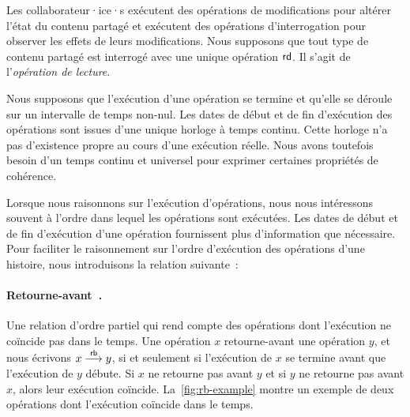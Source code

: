 Les collaborateur·ice·s exécutent des opérations de modifications pour altérer l'état du contenu partagé et exécutent des opérations d'interrogation pour observer les effets de leurs modifications.
Nous supposons que tout type de contenu partagé est interrogé avec une unique opération $\operatorname{\mathsf{rd}}$.
Il s'agit de l'\emph{opération de lecture}.

Nous supposons que l'exécution d'une opération se termine et qu'elle se déroule sur un intervalle de temps non-nul.
Les dates de début et de fin d'exécution des opérations sont issues d'une unique horloge à temps continu.
Cette horloge n'a pas d'existence propre au cours d'une exécution réelle.
Nous avons toutefois besoin d'un temps continu et universel pour exprimer certaines propriétés de cohérence.

Lorsque nous raisonnons sur l'exécution d'opérations, nous nous intéressons souvent à l'ordre dans lequel les opérations sont exécutées.
Les dates de début et de fin d'exécution d'une opération fournissent plus d'information que nécessaire.
Pour faciliter le raisonnement sur l'ordre d'exécution des opérations d'une histoire, nous introduisons la relation suivante~:

\paragraph{Retourne-avant~\autocite{burckhardt_eventualconsistency_2014}.} Une relation d'ordre partiel qui rend compte des opérations dont l'exécution ne coïncide pas dans le temps.
Une opération $x$ retourne-avant une opération $y$, et nous écrivons $x \overset{\mathsf{rb}}{\longrightarrow} y$, si et seulement si l'exécution de $x$ se termine avant que l'exécution de $y$ débute.
Si $x$ ne retourne pas avant $y$ et si $y$ ne retourne pas avant $x$, alors leur exécution coïncide.
La~\autoref{fig:rb-example} montre un exemple de deux opérations dont l'exécution coïncide dans le temps.

